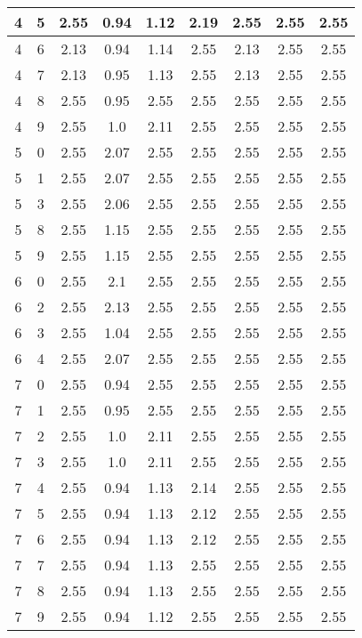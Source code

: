 \begin{longtable}{|c|c||c||c|c|c||c|c|c|}
	4 & 5 & 2.55 & 0.94 & 1.12 & 2.19 & 2.55 & 2.55 & 2.55 \\ \hline
	4 & 6 & 2.13 & 0.94 & 1.14 & 2.55 & 2.13 & 2.55 & 2.55 \\ \hline
	4 & 7 & 2.13 & 0.95 & 1.13 & 2.55 & 2.13 & 2.55 & 2.55 \\ \hline
	4 & 8 & 2.55 & 0.95 & 2.55 & 2.55 & 2.55 & 2.55 & 2.55 \\ \hline
	4 & 9 & 2.55 & 1.0 & 2.11 & 2.55 & 2.55 & 2.55 & 2.55 \\ \hline
	5 & 0 & 2.55 & 2.07 & 2.55 & 2.55 & 2.55 & 2.55 & 2.55 \\ \hline
	5 & 1 & 2.55 & 2.07 & 2.55 & 2.55 & 2.55 & 2.55 & 2.55 \\ \hline
	5 & 3 & 2.55 & 2.06 & 2.55 & 2.55 & 2.55 & 2.55 & 2.55 \\ \hline
	5 & 8 & 2.55 & 1.15 & 2.55 & 2.55 & 2.55 & 2.55 & 2.55 \\ \hline
	5 & 9 & 2.55 & 1.15 & 2.55 & 2.55 & 2.55 & 2.55 & 2.55 \\ \hline
	6 & 0 & 2.55 & 2.1 & 2.55 & 2.55 & 2.55 & 2.55 & 2.55 \\ \hline
	6 & 2 & 2.55 & 2.13 & 2.55 & 2.55 & 2.55 & 2.55 & 2.55 \\ \hline
	6 & 3 & 2.55 & 1.04 & 2.55 & 2.55 & 2.55 & 2.55 & 2.55 \\ \hline
	6 & 4 & 2.55 & 2.07 & 2.55 & 2.55 & 2.55 & 2.55 & 2.55 \\ \hline
	7 & 0 & 2.55 & 0.94 & 2.55 & 2.55 & 2.55 & 2.55 & 2.55 \\ \hline
	7 & 1 & 2.55 & 0.95 & 2.55 & 2.55 & 2.55 & 2.55 & 2.55 \\ \hline
	7 & 2 & 2.55 & 1.0 & 2.11 & 2.55 & 2.55 & 2.55 & 2.55 \\ \hline
	7 & 3 & 2.55 & 1.0 & 2.11 & 2.55 & 2.55 & 2.55 & 2.55 \\ \hline
	7 & 4 & 2.55 & 0.94 & 1.13 & 2.14 & 2.55 & 2.55 & 2.55 \\ \hline
	7 & 5 & 2.55 & 0.94 & 1.13 & 2.12 & 2.55 & 2.55 & 2.55 \\ \hline
	7 & 6 & 2.55 & 0.94 & 1.13 & 2.12 & 2.55 & 2.55 & 2.55 \\ \hline
	7 & 7 & 2.55 & 0.94 & 1.13 & 2.55 & 2.55 & 2.55 & 2.55 \\ \hline
	7 & 8 & 2.55 & 0.94 & 1.13 & 2.55 & 2.55 & 2.55 & 2.55 \\ \hline
	7 & 9 & 2.55 & 0.94 & 1.12 & 2.55 & 2.55 & 2.55 & 2.55 \\ \hline
\end{longtable}
\clearpage{}
